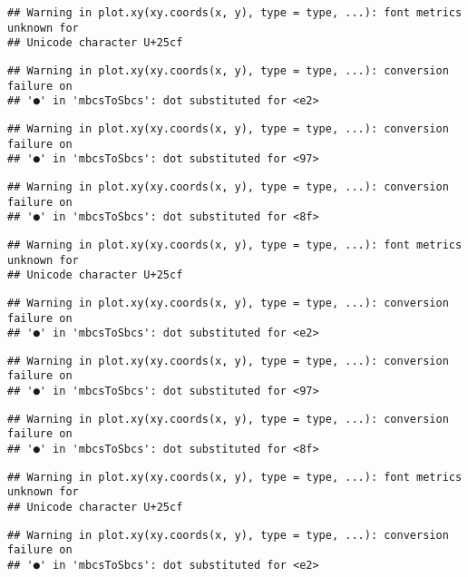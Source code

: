 \documentclass[
]{article}
\begin{document}
\begin{verbatim}
## Warning in plot.xy(xy.coords(x, y), type = type, ...): font metrics unknown for
## Unicode character U+25cf
\end{verbatim}

\begin{verbatim}
## Warning in plot.xy(xy.coords(x, y), type = type, ...): conversion failure on
## '●' in 'mbcsToSbcs': dot substituted for <e2>
\end{verbatim}

\begin{verbatim}
## Warning in plot.xy(xy.coords(x, y), type = type, ...): conversion failure on
## '●' in 'mbcsToSbcs': dot substituted for <97>
\end{verbatim}

\begin{verbatim}
## Warning in plot.xy(xy.coords(x, y), type = type, ...): conversion failure on
## '●' in 'mbcsToSbcs': dot substituted for <8f>
\end{verbatim}

\begin{verbatim}
## Warning in plot.xy(xy.coords(x, y), type = type, ...): font metrics unknown for
## Unicode character U+25cf
\end{verbatim}

\begin{verbatim}
## Warning in plot.xy(xy.coords(x, y), type = type, ...): conversion failure on
## '●' in 'mbcsToSbcs': dot substituted for <e2>
\end{verbatim}

\begin{verbatim}
## Warning in plot.xy(xy.coords(x, y), type = type, ...): conversion failure on
## '●' in 'mbcsToSbcs': dot substituted for <97>
\end{verbatim}

\begin{verbatim}
## Warning in plot.xy(xy.coords(x, y), type = type, ...): conversion failure on
## '●' in 'mbcsToSbcs': dot substituted for <8f>
\end{verbatim}

\begin{verbatim}
## Warning in plot.xy(xy.coords(x, y), type = type, ...): font metrics unknown for
## Unicode character U+25cf
\end{verbatim}

\begin{verbatim}
## Warning in plot.xy(xy.coords(x, y), type = type, ...): conversion failure on
## '●' in 'mbcsToSbcs': dot substituted for <e2>
\end{verbatim}
\end{document}
